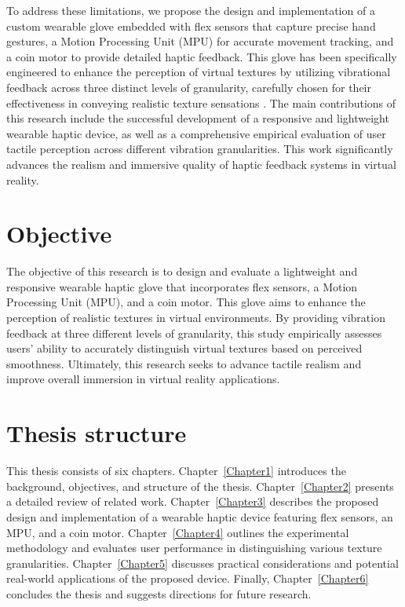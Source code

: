 To address these limitations, we propose the design and implementation of a custom wearable glove embedded with flex sensors that capture precise hand gestures, a Motion Processing Unit (MPU) for accurate movement tracking, and a coin motor to provide detailed haptic feedback. This glove has been specifically engineered to enhance the perception of virtual textures by utilizing vibrational feedback across three distinct levels of granularity, carefully chosen for their effectiveness in conveying realistic texture sensations \cite{10.1145/3025453.3025812}. The main contributions of this research include the successful development of a responsive and lightweight wearable haptic device, as well as a comprehensive empirical evaluation of user tactile perception across different vibration granularities. This work significantly advances the realism and immersive quality of haptic feedback systems in virtual reality.


\section{Objective}

The objective of this research is to design and evaluate a lightweight and responsive wearable haptic glove that incorporates flex sensors, a Motion Processing Unit (MPU), and a coin motor. This glove aims to enhance the perception of realistic textures in virtual environments. By providing vibration feedback at three different levels of granularity, this study empirically assesses users' ability to accurately distinguish virtual textures based on perceived smoothness. Ultimately, this research seeks to advance tactile realism and improve overall immersion in virtual reality applications.

\section{Thesis structure}
This thesis consists of six chapters. Chapter~\ref{Chapter1} introduces the background, objectives, and structure of the thesis. Chapter~\ref{Chapter2} presents a detailed review of related work. Chapter~\ref{Chapter3} describes the proposed design and implementation of a wearable haptic device featuring flex sensors, an MPU, and a coin motor. Chapter~\ref{Chapter4} outlines the experimental methodology and evaluates user performance in distinguishing various texture granularities. Chapter~\ref{Chapter5} discusses practical considerations and potential real-world applications of the proposed device. Finally, Chapter~\ref{Chapter6} concludes the thesis and suggests directions for future research.




